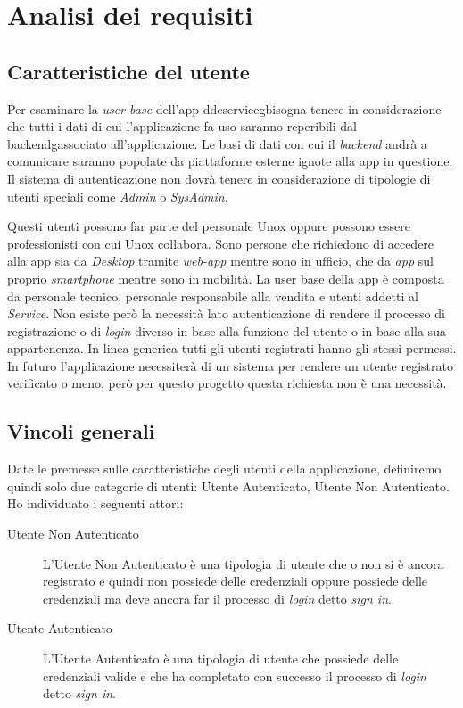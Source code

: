 \chapter{Analisi dei requisiti}
\label{chap:analisi_requisiti}

\section{Caratteristiche del utente}
Per esaminare la \textit{user base} dell'app \gls{ddcserviceg}\glox bisogna tenere in considerazione 
che tutti i dati di cui l'applicazione fa uso saranno reperibili dal \gls{backendg}\glox associato all'applicazione.
Le basi di dati con cui il \textit{backend} andrà a comunicare saranno popolate da piattaforme esterne ignote alla app in questione.
Il sistema di autenticazione non dovrà tenere in considerazione di tipologie di utenti speciali come \textit{Admin} o \textit{SysAdmin}.

Questi utenti possono far parte del personale Unox oppure possono essere professionisti con cui Unox collabora.
Sono persone che richiedono di accedere alla app sia da \textit{Desktop} tramite \textit{web-app} mentre sono in ufficio, che da \textit{app} sul proprio \textit{smartphone} mentre sono in mobilità.
La user base della app è composta da personale tecnico, personale responsabile alla vendita e utenti addetti al \textit{Service}.
Non esiste però la necessità lato autenticazione di rendere il processo di registrazione o di \textit{login} diverso in base alla funzione del utente o in base alla sua appartenenza.
In linea generica tutti gli utenti registrati hanno gli stessi permessi.
In futuro l'applicazione necessiterà di un sistema per rendere un utente registrato verificato o meno, però per questo progetto questa richiesta non è una necessità.

\section{Vincoli generali}
Date le premesse sulle caratteristiche degli utenti della applicazione, definiremo quindi solo due categorie di utenti: Utente Autenticato, Utente Non Autenticato.
Ho individuato i seguenti attori:
\begin{description}
	\item[Utente Non Autenticato] L'Utente Non Autenticato è una tipologia di utente che o non si è ancora registrato e quindi non possiede delle credenziali oppure possiede delle credenziali ma deve ancora far il processo di \textit{login} detto \textit{sign in}.
	\item[Utente Autenticato] L'Utente Autenticato è una tipologia di utente che possiede delle credenziali valide e che ha completato con successo il processo di \textit{login} detto \textit{sign in}.
\end{description}

